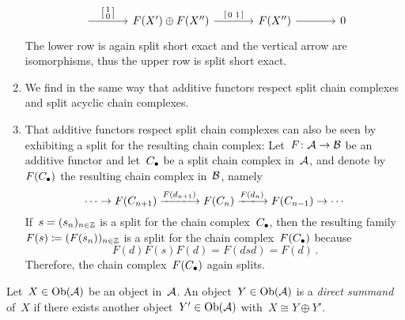 \begin{remark*}
\begin{enumerate}
\[\begin{tikzcd}[ampersand replacement = \&, column sep = large]
              \arrow{r}[above]{\begin{bsmallmatrix} 1 \\ 0 \end{bsmallmatrix}}
          \&  F(X') \oplus F(X'')
              \arrow{r}[above]{{\begin{bsmallmatrix} 0 & 1 \end{bsmallmatrix}}}
          \&  F(X'')
              \arrow{r}
          \&  0
        \end{tikzcd}
      \]
      The lower row is again split short exact and the vertical arrow are isomorphisms, thus the upper row is split short exact.
    \item
      We find in the same way that additive functors respect split chain complexes and split acyclic chain complexes.
    \item
      That additive functors respect split chain complexes can also be seen by exhibiting a split for the resulting chain complex:
      Let~$F \colon \mathcal{A} \to \mathcal{B}$ be an additive functor and let~$C_\bullet$ be a split chain complex in~$\mathcal{A}$, and denote by~$F(C_\bullet)$ the resulting chain complex in~$\mathcal{B}$, namely
      \[
        \dotsb
        \to
        F(C_{n+1})
        \xlongto{F(d_{n+1})}
        F(C_n)
        \xlongto{F(d_n)}
        F(C_{n-1})
        \to
        \dotsb
      \]
      If~$s = (s_n)_{n \in \mathbb{Z}}$ is a split for the chain complex~$C_\bullet$, then the resulting family~$F(s) \coloneqq (F(s_n))_{n \in \mathbb{Z}}$ is a split for the chain complex~$F(C_\bullet)$ because
      \[
        F(d) F(s) F(d)
        =
        F(dsd)
        =
        F(d) \,.
      \]
      Therefore, the chain complex~$F(C_\bullet)$ again splits.
  \end{enumerate}
\end{remark*}


\begin{definition*}
  Let~$X \in \operatorname{Ob}(\mathcal{A})$ be an object in~$\mathcal{A}$.
  An object~$Y \in \operatorname{Ob}(\mathcal{A})$ is a \emph{direct summand} of~$X$ if there exists another object~$Y' \in \operatorname{Ob}(\mathcal{A})$ with~$X \cong Y \oplus Y'$.
\end{definition*}




